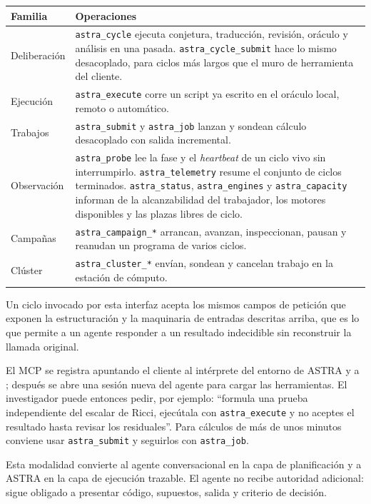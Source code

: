 \documentclass[11pt,a4paper]{article}
\begin{document}
\begin{center}
\small
\begin{tabular}{@{}lp{10.0cm}@{}}
\toprule
Familia & Operaciones \\
\midrule
Deliberación & \texttt{astra\_cycle} ejecuta conjetura, traducción, revisión, oráculo y análisis en una pasada. \texttt{astra\_cycle\_submit} hace lo mismo desacoplado, para ciclos más largos que el muro de herramienta del cliente. \\
Ejecución & \texttt{astra\_execute} corre un script ya escrito en el oráculo local, remoto o automático. \\
Trabajos & \texttt{astra\_submit} y \texttt{astra\_job} lanzan y sondean cálculo desacoplado con salida incremental. \\
Observación & \texttt{astra\_probe} lee la fase y el \textit{heartbeat} de un ciclo vivo sin interrumpirlo. \texttt{astra\_telemetry} resume el conjunto de ciclos terminados. \texttt{astra\_status}, \texttt{astra\_engines} y \texttt{astra\_capacity} informan de la alcanzabilidad del trabajador, los motores disponibles y las plazas libres de ciclo. \\
Campañas & \texttt{astra\_campaign\_*} arrancan, avanzan, inspeccionan, pausan y reanudan un programa de varios ciclos. \\
Clúster & \texttt{astra\_cluster\_*} envían, sondean y cancelan trabajo en la estación de cómputo. \\
\bottomrule
\end{tabular}
\end{center}

Un ciclo invocado por esta interfaz acepta los mismos campos de petición que exponen la estructuración y la maquinaria de entradas descritas arriba, que es lo que permite a un agente responder a un resultado indecidible sin reconstruir la llamada original.

El MCP se registra apuntando el cliente al intérprete del entorno de ASTRA y a ; después se abre una sesión nueva del agente para cargar las herramientas. El investigador puede entonces pedir, por ejemplo: ``formula una prueba independiente del escalar de Ricci, ejecútala con \texttt{astra\_execute} y no aceptes el resultado hasta revisar los residuales''. Para cálculos de más de unos minutos conviene usar \texttt{astra\_submit} y seguirlos con \texttt{astra\_job}.

Esta modalidad convierte al agente conversacional en la capa de planificación y a ASTRA en la capa de ejecución trazable. El agente no recibe autoridad adicional: sigue obligado a presentar código, supuestos, salida y criterio de decisión.
\end{document}
